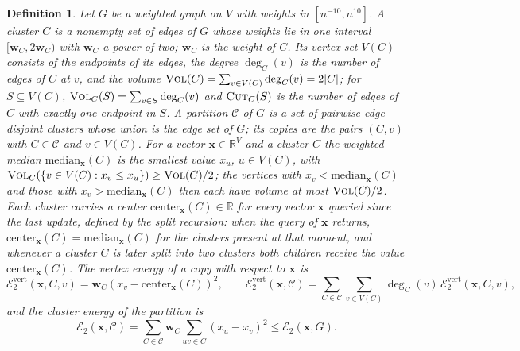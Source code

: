 \documentclass[11pt]{article}
\newtheorem{definition}[theorem]{Definition}
\theoremstyle{remark}
\newcommand{\ww}{\mathbf w}
\newcommand{\xx}{\mathbf x}
\newcommand{\Ccal}{\mathcal{C}}
\newcommand{\Ecal}[1]{\mathcal E_{#1}}
\newcommand{\Ecalvert}[1]{\mathcal{E}^{\mathrm{vert}}_{#1}}
\newcommand{\R}{\mathbb R}
\newcommand{\vol}{\textsc{Vol}}
\newcommand{\cut}{\textsc{Cut}}
\begin{document}
\begin{definition}
\label{def:cluster}
Let $G$ be a weighted graph on $V$ with weights in $[n^{-10}, n^{10}]$.
A \emph{cluster} $C$ is a nonempty set of edges of $G$ whose weights lie in
one interval $[\ww_C, 2\ww_C)$ with $\ww_C$ a power of two; $\ww_C$ is the
\emph{weight} of $C$.
Its vertex set $V(C)$ consists of the endpoints of its edges, the
\emph{degree} $\deg_C(v)$ is the number of edges of $C$ at $v$, and the
\emph{volume} $\vol(C) = \sum_{v \in V(C)} \deg_C(v) = 2|C|$; for
$S \subseteq V(C)$, $\vol_C(S) = \sum_{v \in S} \deg_C(v)$ and
$\cut_C(S)$ is the number of edges of $C$ with exactly one endpoint in $S$.
A \emph{partition} $\Ccal$ of $G$ is a set of pairwise edge-disjoint
clusters whose union is the edge set of $G$; its \emph{copies} are the pairs
$(C, v)$ with $C \in \Ccal$ and $v \in V(C)$.
For a vector $\xx \in \R^{V}$ and a cluster $C$ the \emph{weighted median}
$\mathrm{median}_{\xx}(C)$ is the smallest value $x_u$, $u \in V(C)$, with
$\vol_C(\{v \in V(C) : x_v \le x_u\}) \ge \vol(C)/2$; the vertices with
$x_v < \mathrm{median}_{\xx}(C)$ and those with
$x_v > \mathrm{median}_{\xx}(C)$ then each have volume at most
$\vol(C)/2$.
Each cluster carries a \emph{center} $\mathrm{center}_{\xx}(C) \in \R$ for
every vector $\xx$ queried since the last update, defined by the split
recursion: when the query of $\xx$ returns,
$\mathrm{center}_{\xx}(C) = \mathrm{median}_{\xx}(C)$ for the clusters
present at that moment, and whenever a cluster $C$ is later split into two
clusters both children receive the value $\mathrm{center}_{\xx}(C)$.
The \emph{vertex energy} of a copy with respect to $\xx$ is
\[
\Ecalvert{2}(\xx, C, v)
= \ww_C \left( x_v - \mathrm{center}_{\xx}(C) \right)^{2},
\qquad
\Ecalvert{2}(\xx, \Ccal)
= \sum_{C \in \Ccal} \sum_{v \in V(C)} \deg_C(v) \, \Ecalvert{2}(\xx, C, v),
\]
and the \emph{cluster energy} of the partition is
\[
\Ecal{2}(\xx, \Ccal)
= \sum_{C \in \Ccal} \ww_C \sum_{uv \in C} \left( x_u - x_v \right)^{2}
\le \Ecal{2}(\xx, G).
\]
\end{definition}
\end{document}
